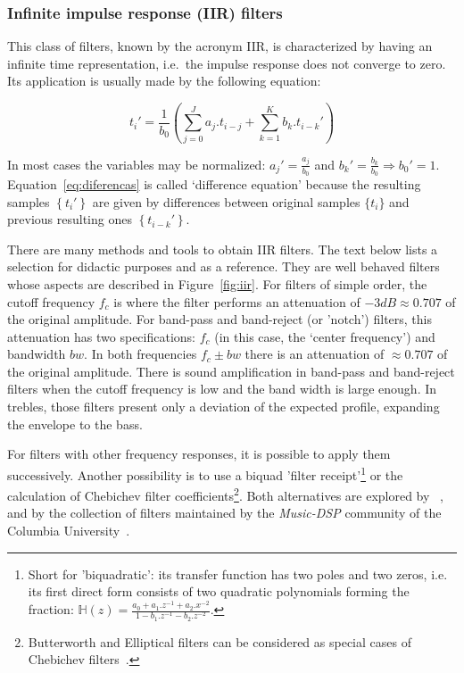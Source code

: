 \subsubsection{Infinite impulse response (IIR) filters}

This class of filters, known by the acronym IIR, is characterized by having an infinite time representation, i.e.\ the impulse response does not converge to zero. Its application is usually made by the following equation:

\begin{equation}\label{eq:diferencas}
 t_i' = \frac{1}{b_0}\left ( \sum_{j=0}^Ja_j . t_{i-j} + \sum_{k=1}^Kb_k . t_{i-k}' \right )
\end{equation}

In most cases the variables may be normalized: $a_j'=\frac{a_j}{b_0}$ and $b_k'=\frac{b_k}{b_0} \Rightarrow b_0' = 1$.
Equation~\ref{eq:diferencas} is called `difference equation' because the resulting samples $\left\{t_i'\right\}$ are given by differences between original samples $\{t_i\}$ and previous resulting ones $\left\{t_{i-k}'\right\}$.

There are many methods and tools to obtain IIR filters. The text below lists a selection for didactic purposes and as a reference. They are well behaved filters whose aspects are described in Figure~\ref{fig:iir}. For filters of simple order, the cutoff frequency $f_c$ is where the filter performs an attenuation of $-3dB \approx 0.707 $ of the original amplitude.
For band-pass and band-reject (or 'notch') filters, this attenuation has two specifications: $f_c$ (in this case, the `center frequency') and bandwidth $bw$. In both frequencies $f_c \pm bw$ there is an attenuation of $\approx 0.707$ of the original amplitude.
There is sound amplification in band-pass and band-reject filters when the cutoff frequency is low and the band width is large enough. In trebles, those filters present only a deviation of the expected profile, expanding the envelope to the bass.

For filters with other frequency responses, it is possible to apply them successively. Another possibility is to use a biquad 'filter receipt'\footnote{Short for 'biquadratic': its transfer function has two poles and two zeros, i.e. its first direct form consists of two quadratic polynomials forming the fraction: $\mathbb{H}(z)=\frac{a_0+a_1.z^{-1}+a_2.x^{-2}}{1- b_1.z^{-1} -b_2 . z^{-2}}$.} or the calculation of Chebichev filter coefficients\footnote{Butterworth and Elliptical filters can be considered as special cases of Chebichev filters~\cite{Openheim,smith}.}.
Both alternatives are explored by ~\cite{JOSFM,smith}, and by the collection of filters maintained by the \emph{Music-DSP} community of the Columbia University~\cite{music-dsp,Openheim}.

